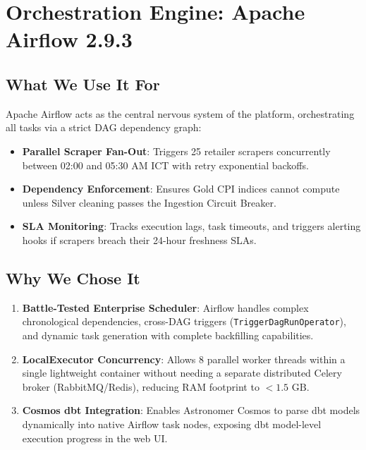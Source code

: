 \documentclass[a4paper, 11pt]{article}
\begin{document}
\newpage
\section{Orchestration Engine: Apache Airflow 2.9.3}

\subsection{What We Use It For}
Apache Airflow acts as the central nervous system of the platform, orchestrating all tasks via a strict DAG dependency graph:
\begin{itemize}[leftmargin=*]
    \item \textbf{Parallel Scraper Fan-Out}: Triggers 25 retailer scrapers concurrently between 02:00 and 05:30 AM ICT with retry exponential backoffs.
    \item \textbf{Dependency Enforcement}: Ensures Gold CPI indices cannot compute unless Silver cleaning passes the Ingestion Circuit Breaker.
    \item \textbf{SLA Monitoring}: Tracks execution lags, task timeouts, and triggers alerting hooks if scrapers breach their 24-hour freshness SLAs.
\end{itemize}

\subsection{Why We Chose It}
\begin{enumerate}[leftmargin=*]
    \item \textbf{Battle-Tested Enterprise Scheduler}: Airflow handles complex chronological dependencies, cross-DAG triggers (\texttt{TriggerDagRunOperator}), and dynamic task generation with complete backfilling capabilities.
    \item \textbf{LocalExecutor Concurrency}: Allows 8 parallel worker threads within a single lightweight container without needing a separate distributed Celery broker (RabbitMQ/Redis), reducing RAM footprint to $<1.5\text{ GB}$.
    \item \textbf{Cosmos dbt Integration}: Enables Astronomer Cosmos to parse dbt models dynamically into native Airflow task nodes, exposing dbt model-level execution progress in the web UI.
\end{enumerate}
\end{document}

